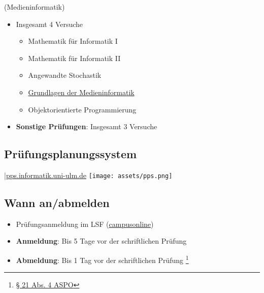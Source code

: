 \documentclass[
	aspectratio=169, 
	10pt 
]{beamer}
\begin{document}
\begin{frame}{\insertsubsection \space (Medieninformatik)}
    \begin{itemize}
        \item Insgesamt 4 Versuche \footnotemark[1] \begin{itemize} 
            \item Mathematik für Informatik I
            \item Mathematik für Informatik II
            \item Angewandte Stochastik
            \item \underline{Grundlagen der Medieninformatik}
            \item Objektorientierte Programmierung \end{itemize}
        \item \textbf{Sonstige Prüfungen}: Insgesamt 3 Versuche
    \end{itemize}

\end{frame}

\subsection{Prüfungsplanungssystem}
\begin{frame}{\insertsubsection \space|\space \underline{\href{https://pps.informatik.uni-ulm.de/index.php}{pps.informatik.uni-ulm.de}}}
    \texttt{[image: assets/pps.png]}
\end{frame}


\subsection{Wann an/abmelden}
\begin{frame}{\insertsubsection}
    \begin{itemize}
        \item Prüfungsanmeldung im LSF (\underline{\href{https://campusonline.uni-ulm.de}{campusonline}})
        \item \textbf{Anmeldung}: Bis 5 Tage vor der schriftlichen Prüfung
        \item \textbf{Abmeldung}: Bis 1 Tag vor der schriftlichen Prüfung \footnote{\href{https://www.uni-ulm.de/fileadmin/website_uni_ulm/zuv/zuv.dezIII.abt2u3/3-2oeffentlich/bekanntmachungen/2022/veroeffentlichung_asop_final.pdf}{§ 21 Abs. 4 ASPO}}
    \end{itemize}
\end{frame}
\end{document}
